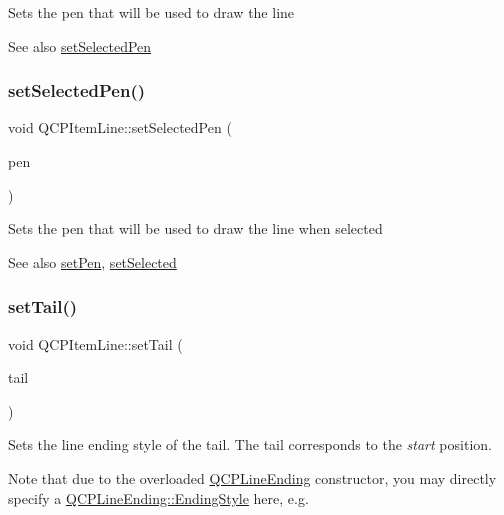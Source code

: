 Sets the pen that will be used to draw the line

\begin{DoxySeeAlso}{See also}
\mbox{\hyperlink{class_q_c_p_item_line_a3e2fec44503277e77717e9c24f87f1ea}{set\+Selected\+Pen}} 
\end{DoxySeeAlso}
\mbox{\label{class_q_c_p_item_line_a3e2fec44503277e77717e9c24f87f1ea}} 
\subsubsection{\texorpdfstring{setSelectedPen()}{setSelectedPen()}}
{\footnotesize\ttfamily void Q\+C\+P\+Item\+Line\+::set\+Selected\+Pen (\begin{DoxyParamCaption}\item[{const Q\+Pen \&}]{pen }\end{DoxyParamCaption})}

Sets the pen that will be used to draw the line when selected

\begin{DoxySeeAlso}{See also}
\mbox{\hyperlink{class_q_c_p_item_line_a572528dab61c1abe205822fbd5db4b27}{set\+Pen}}, \mbox{\hyperlink{class_q_c_p_abstract_item_a203de94ad586cc44d16c9565f49d3378}{set\+Selected}} 
\end{DoxySeeAlso}
\mbox{\label{class_q_c_p_item_line_ac264222c3297a7efe33df9345c811a5f}} 
\subsubsection{\texorpdfstring{setTail()}{setTail()}}
{\footnotesize\ttfamily void Q\+C\+P\+Item\+Line\+::set\+Tail (\begin{DoxyParamCaption}\item[{const \mbox{\hyperlink{class_q_c_p_line_ending}{Q\+C\+P\+Line\+Ending}} \&}]{tail }\end{DoxyParamCaption})}

Sets the line ending style of the tail. The tail corresponds to the {\itshape start} position.

Note that due to the overloaded \mbox{\hyperlink{class_q_c_p_line_ending}{Q\+C\+P\+Line\+Ending}} constructor, you may directly specify a \mbox{\hyperlink{class_q_c_p_line_ending_a5ef16e6876b4b74959c7261d8d4c2cd5}{Q\+C\+P\+Line\+Ending\+::\+Ending\+Style}} here, e.\+g.
\begin{DoxyCode}{0}
\end{DoxyCode}


